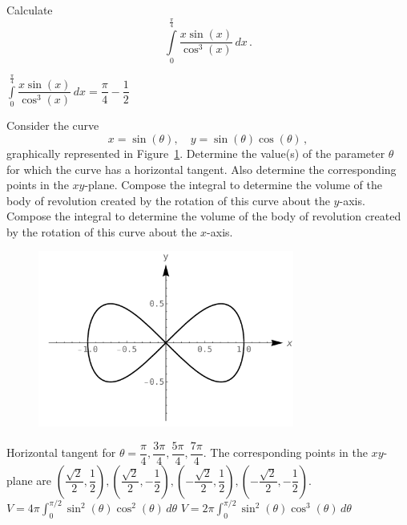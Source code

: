 \begin{Exercise} Calculate
$$
\displaystyle\int\limits_0^{\frac{\pi}{4}}\dfrac{x\sin(x)}{\cos^3(x)}\,dx\,.
$$
\end{Exercise}

\begin{Answer}
$\displaystyle\int\limits_0^{\frac{\pi}{4}}\dfrac{x\sin(x)}{\cos^3(x)}\,dx = \dfrac{\pi}{4}-\dfrac{1}{2}$    
\end{Answer}



\begin{Exercise} Consider the curve 
\[ x=\sin(\theta), \quad y = \sin(\theta)\cos(\theta)\,, \]
graphically represented in Figure~\ref{lemmiscaat}. 
\Question Determine the value(s) of the parameter $\theta$ for which the curve has a horizontal tangent. Also determine the corresponding points in the $xy$-plane. 
\Question Compose the integral to determine the volume of the body of revolution created by the rotation of this curve about the $y$-axis. 
\Question Compose the integral to determine the volume of the body of revolution created by the rotation of this curve about the $x$-axis. 

\begin{figure}[H]
\centering
\includegraphics[width=0.75\textwidth]{lemmiscaat}

\caption{\label{lemmiscaat}}
\end{figure}
\end{Exercise}

\begin{Answer}

\Question Horizontal tangent for $\theta = \dfrac{\pi}{4}, \dfrac{3\pi}{4}, \dfrac{5\pi}{4}, \dfrac{7\pi}{4}$. The corresponding points in the $xy$-plane are $\left(\dfrac{\sqrt{2}}{2},\dfrac{1}{2}\right), \left(\dfrac{\sqrt{2}}{2},-\dfrac{1}{2}\right), \left(-\dfrac{\sqrt{2}}{2},\dfrac{1}{2}\right), \left(-\dfrac{\sqrt{2}}{2},-\dfrac{1}{2}\right)$.
\Question $\displaystyle V = 4\pi\int_0^{\pi/2} \sin^2(\theta)\cos^2(\theta)\,d\theta$
\Question $\displaystyle V = 2\pi\int_0^{\pi/2} \sin^2(\theta)\cos^3(\theta)\,d\theta$
    
\end{Answer}


